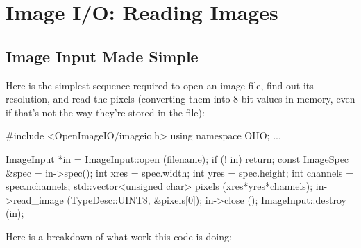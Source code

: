 \chapter{Image I/O: Reading Images}
\label{chap:imageinput}


\section{Image Input Made Simple}
\label{sec:imageinput:simple}

Here is the simplest sequence required to open an image file, find
out its resolution, and read the pixels (converting them into
8-bit values in memory, even if that's not the way they're stored in the file):

\begin{code}
        #include <OpenImageIO/imageio.h>
        using namespace OIIO;
        ...

        ImageInput *in = ImageInput::open (filename);
        if (! in)
            return;
        const ImageSpec &spec = in->spec();
        int xres = spec.width;
        int yres = spec.height;
        int channels = spec.nchannels;
        std::vector<unsigned char> pixels (xres*yres*channels);
        in->read_image (TypeDesc::UINT8, &pixels[0]);
        in->close ();
        ImageInput::destroy (in);
\end{code}

\noindent Here is a breakdown of what work this code is doing:

